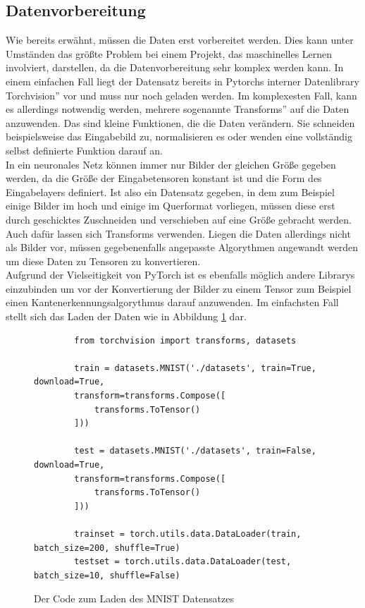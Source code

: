 \documentclass{article}
\begin{document}
\subsection{Datenvorbereitung}
Wie bereits erwähnt, müssen die Daten erst vorbereitet werden. Dies kann unter Umständen das größte Problem bei einem Projekt, das maschinelles Lernen involviert, darstellen, da die Datenvorbereitung sehr komplex werden kann. In einem einfachen Fall liegt der Datensatz bereits in Pytorchs interner Datenlibrary \glqq Torchvision'' vor und muss nur noch geladen werden. Im komplexesten Fall, kann es allerdings notwendig werden, mehrere sogenannte \glqq Transforms'' auf die Daten anzuwenden. Das sind kleine Funktionen, die die Daten verändern. Sie schneiden beispielsweise das Eingabebild zu, normalisieren es oder wenden eine vollständig selbst definierte Funktion darauf an.\\
In ein neuronales Netz können immer nur Bilder der gleichen Größe gegeben werden, da die Größe der Eingabetensoren konstant ist und die Form des Eingabelayers definiert. Ist also ein Datensatz gegeben, in dem zum Beispiel  einige Bilder im hoch und einige im Querformat vorliegen, müssen diese erst durch geschicktes Zuschneiden und verschieben auf eine Größe gebracht werden. Auch dafür lassen sich Transforms verwenden. Liegen die Daten allerdings nicht als Bilder vor, müssen gegebenenfalls angepasste Algorythmen angewandt werden um diese Daten zu Tensoren zu konvertieren.\\
Aufgrund der Vielseitigkeit von PyTorch ist es ebenfalls möglich andere Librarys einzubinden um vor der Konvertierung der Bilder zu einem Tensor zum Beispiel einen Kantenerkennungsalgorythmus darauf anzuwenden. Im einfachsten Fall stellt sich das Laden der Daten wie in Abbildung \ref{MNIST_Dataloader_Code} dar.
\begin{figure}[h]
	\begin{verbatim}
		from torchvision import transforms, datasets
	
		train = datasets.MNIST('./datasets', train=True, download=True,
		transform=transforms.Compose([
			transforms.ToTensor()
		]))
		
		test = datasets.MNIST('./datasets', train=False, download=True,
		transform=transforms.Compose([
			transforms.ToTensor()
		]))
		
		trainset = torch.utils.data.DataLoader(train, batch_size=200, shuffle=True)
		testset = torch.utils.data.DataLoader(test, batch_size=10, shuffle=False)
	\end{verbatim}
	\caption{Der Code zum Laden des MNIST Datensatzes}
	\label{MNIST_Dataloader_Code}
\end{figure}
\end{document}
